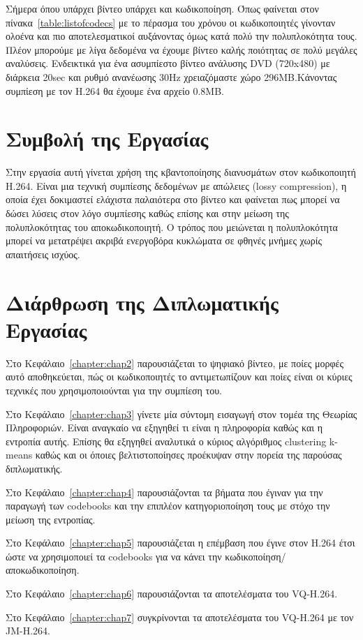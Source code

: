 \indent
Σήμερα όπου υπάρχει βίντεο υπάρχει και κωδικοποίηση. Όπως φαίνεται στον πίνακα~\ref{table:listofcodecs} με το πέρασμα του χρόνου οι κωδικοποιητές γίνονταν ολοένα και πιο αποτελεσματικοί αυξάνοντας όμως κατά πολύ την πολυπλοκότητα τους. Πλέον μπορούμε με λίγα δεδομένα να έχουμε βίντεο καλής ποιότητας σε πολύ μεγάλες αναλύσεις. Ενδεικτικά για ένα ασυμπίεστο βίντεο ανάλυσης DVD (720x480) με διάρκεια 20sec και ρυθμό ανανέωσης \si{30}{Hz} χρειαζόμαστε χώρο 296ΜΒ.Κάνοντας συμπίεση με τον H.264 θα έχουμε ένα αρχείο 0.8ΜΒ.

\section{Συμβολή της Εργασίας}
\label{section:sect12}
\indent
Στην εργασία αυτή γίνεται χρήση της κβαντοποίησης διανυσμάτων στον κωδικοποιητή H.264. Είναι μια τεχνική συμπίεσης δεδομένων με απώλειες (lossy compression), η οποία έχει δοκιμαστεί ελάχιστα παλαιότερα στο βίντεο και φαίνεται πως μπορεί να δώσει λύσεις στον λόγο συμπίεσης καθώς επίσης και στην μείωση της πολυπλοκότητας του αποκωδικοποιητή. Ο τρόπος που μειώνεται η πολυπλοκότητα μπορεί να μετατρέψει ακριβά ενεργοβόρα κυκλώματα σε φθηνές μνήμες χωρίς απαιτήσεις ισχύος.

\section{Διάρθρωση της Διπλωματικής Εργασίας}
\label{section:sect13}


\indent
Στο Κεφάλαιο~\ref{chapter:chap2} παρουσιάζεται το ψηφιακό βίντεο, με ποίες μορφές αυτό αποθηκεύεται, πώς οι κωδικοποιητές το αντιμετωπίζουν και ποίες είναι οι κύριες τεχνικές που χρησιμοποιούνται για την συμπίεση του.\newline

 \indent
Στο Κεφάλαιο~\ref{chapter:chap3} γίνετε μία σύντομη εισαγωγή στον τομέα της Θεωρίας Πληροφοριών. Είναι αναγκαίο να εξηγηθεί τι είναι η πληροφορία καθώς και η εντροπία αυτής. Επίσης θα εξηγηθεί αναλυτικά ο κύριος αλγόριθμος clustering k-means καθώς και οι όποιες βελτιστοποίησες προέκυψαν στην πορεία της παρούσας διπλωματικής.\newline

 \indent
Στο Κεφάλαιο~\ref{chapter:chap4} παρουσιάζονται τα βήματα που έγιναν για την παραγωγή των codebooks και την επιπλέον κατηγοριοποίηση τους με στόχο την μείωση της εντροπίας.\newline

 \indent
Στο Κεφάλαιο~\ref{chapter:chap5} παρουσιάζεται η επέμβαση που έγινε στον H.264 έτσι ώστε να χρησιμοποιεί τα codebooks για να κάνει την κωδικοποίηση/αποκωδικοποίηση.\newline 

 \indent
Στο Κεφάλαιο~\ref{chapter:chap6} παρουσιάζονται τα αποτελέσματα του VQ-H.264.\newline

 \indent
Στο Κεφάλαιο~\ref{chapter:chap7} συγκρίνονται τα αποτελέσματα του VQ-H.264 με τον JM-H.264.\newline